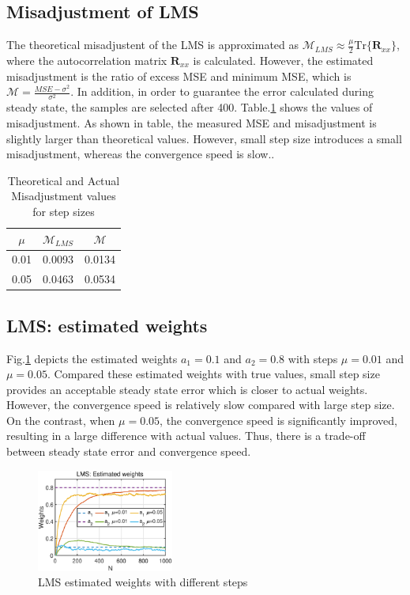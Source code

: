 \subsection{Misadjustment of LMS}
The theoretical misadjustent of the LMS is approximated as $\mathcal{M}_{LMS} \approx \frac{\mu}{2}\mathrm{Tr}\{\mathbf{R}_{xx}\}$, where the autocorrelation matrix $\mathbf{R}_{xx}$ is calculated. However, the estimated misadjustment is the ratio of excess MSE and minimum MSE, which is $\mathcal{M}=\frac{MSE-\sigma^2}{\sigma^2}$. In addition, in order to guarantee the error calculated during steady state, the samples are selected after 400. Table.\ref{tab:M} shows the values of misadjustment. As shown in table, the measured MSE and misadjustment is slightly larger than theoretical values. However, small step size introduces a small misadjustment, whereas the convergence speed is slow..
\begin{table}[htp]
\centering
\caption{Theoretical and Actual Misadjustment values for step sizes}
\begin{tabular}{ |c|c|c| } 
 \hline
 $\mu$ & $\mathcal{M}_{LMS}$ & $\mathcal{M}$ \\ 
 \hline
 0.01 & 0.0093 & 0.0134
 \\ 
 \hline
 0.05 & 0.0463 & 0.0534
 \\ 
 \hline
\end{tabular}
\label{tab:M}
\end{table}
\subsection{LMS: estimated weights}
Fig.\ref{fig:2_1_d} depicts the estimated weights $a_1=0.1$ and $a_2=0.8$ with steps $\mu=0.01$ and $\mu=0.05$. Compared these estimated weights with true values, small step size provides an acceptable steady state error which is closer to actual weights. However, the convergence speed is relatively slow compared with large step size. On the contrast, when $\mu=0.05$, the convergence speed is significantly improved, resulting in a large difference with actual values. Thus, there is a trade-off between steady state error and convergence speed.
\begin{figure}[htp]
     \centering
     \includegraphics[width=0.4\textwidth]{fig/21/21d.eps}
     \caption{LMS estimated weights with different steps}
     \label{fig:2_1_d}
\end{figure}
